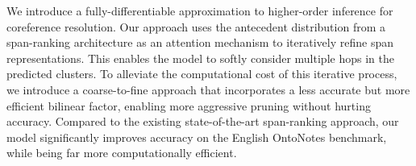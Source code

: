 We introduce a fully-differentiable approximation to higher-order inference for coreference resolution. Our approach uses the antecedent distribution from a span-ranking architecture as an attention mechanism to iteratively refine span representations. This enables the model to softly consider multiple hops in the predicted clusters. To alleviate the computational cost of this iterative process, we introduce a coarse-to-fine approach that incorporates a less accurate but more efficient bilinear factor, enabling more aggressive pruning without hurting accuracy. Compared to the existing state-of-the-art span-ranking approach, our model significantly improves accuracy on the English OntoNotes benchmark, while being far more computationally efficient.
